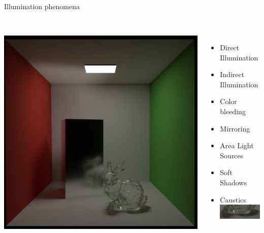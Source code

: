 \documentclass[utf8,stillsansserifmath,fleqn,t]{beamer}
\begin{document}
\begin{frame}[label=illumination-effects-img]
\frametitle{\insertsection}
Illumination phenomena\\
\begin{columns}
\begin{column}{.5\textwidth}
~\\
\includegraphics[width=\textwidth]{./fig/cornellbox-phenomena.png}
\end{column}
\begin{column}{.5\textwidth}
~\\[-\baselineskip]
\begin{itemize}
\item Direct Illumination
\item Indirect Illumination
\item Color bleeding
\item Mirroring
\item Area Light Sources
\item Soft Shadows
\item Caustics\\[1ex]
\includegraphics[width=.8\textwidth]{./fig/cornellbox-caustics-cutout.png}\\
\end{itemize}
\end{column}
\end{columns}
\end{frame}
\end{document}
